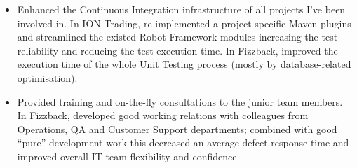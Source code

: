 \documentclass{res}
\begin{document}
\begin{resume}
\begin{itemize}
 \item Enhanced the Continuous Integration infrastructure of all projects I've been involved in. In ION Trading, re-implemented a project-specific Maven plugins and streamlined the existed Robot Framework modules increasing the test reliability and reducing the test execution time. In Fizzback, improved the execution time of the whole Unit Testing process (mostly by database-related optimisation).
 \item Provided training and on-the-fly consultations to the junior team members. In Fizzback, developed good working relations with colleagues from Operations, QA and Customer Support departments; combined with good ``pure'' development work this decreased an average defect response time and improved overall IT team flexibility and confidence.
 \end{itemize}


\end{resume}
\end{document}
